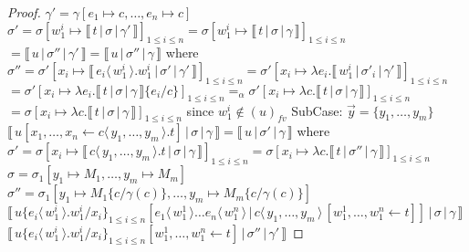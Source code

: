 \documentclass[a4paper,UKenglish,cleveref, autoref]{lipics-v2019}
\newcommand{\fv}[1]{(#1)_{fv}}
\newcommand{\set}[1]{ \{ #1 \} }
\newcommand{\abs}[2]{\lambda #1 . #2}
\newcommand{\fake}[3]{#1 \langle \, #2 \, \rangle . #3}
\newcommand{\share}[3]{#1 [#2 \leftarrow #3]}
\newcommand{\dist}[5]{#1 [ #2 \, \vert \, \fakedist{#4}{#5} \, #3 ]}
\newcommand{\fakedist}[2]{#1 \langle \, #2 \, \rangle}
\newcommand{\sub}[3]{#1 \{ #2 / #3 \}}
\newcommand{\readbackwmap}[3]{\llbracket \, #1 \, \vert \, #2 \, \vert \, #3  \, \rrbracket }
\begin{document}
\begin{proof}
$\gamma' = \gamma [e_{1}  \mapsto c, \dots, e_{n} \mapsto c]$
\newline
$\sigma' = \sigma [w^{i}_{1} \mapsto \readbackwmap{t}{\sigma}{\gamma'}]_{1 \leq i \leq n} = \sigma [w^{i}_{1} \mapsto \readbackwmap{t}{\sigma}{\gamma}]_{1 \leq i \leq n}$
\newline
$= \readbackwmap{u}{\sigma''}{\gamma'} = \readbackwmap{u}{\sigma''}{\gamma}$
\newline
where
\newline
$\sigma'' = \sigma' [x_{i} \mapsto \readbackwmap{\fake{e_{i}}{w^{i}_{1}}{w^{i}_{1}}}{\sigma'}{\gamma'}]_{1 \leq i \leq n} = \sigma' [x_{i} \mapsto \abs{e_{i}}{\readbackwmap{w^{i}_{1}}{\sigma'_{i}}{\gamma'}}]_{1 \leq i \leq n}$
\newline
\indent $= \sigma' [x_{i} \mapsto \abs{e_{i}}{\readbackwmap{t}{\sigma}{\gamma} \sub{}{e_{i}}{c}}]_{1 \leq i \leq n} =_{\alpha} \sigma' [x_{i} \mapsto \abs{c}{\readbackwmap{t}{\sigma}{\gamma}}]_{1 \leq i \leq n}$
\newline
\indent $=  \sigma [x_{i} \mapsto \abs{c}{\readbackwmap{t}{\sigma}{\gamma}}]_{1 \leq i \leq n}$ since $w^{i}_{1} \not\in \fv{u}$
\newline
\newline
SubCase: $\vec{y} = \set{y_{1}, \dots, y_{m}}$
\newline
$\readbackwmap{\share{u}{x_{1}, \dots, x_{n}}{\fake{c}{y_{1}, \dots, y_{m}}{t}}}{\sigma}{\gamma} = \readbackwmap{u}{\sigma'}{\gamma}$
\newline
where
\newline
$\sigma' = \sigma [x_{i} \mapsto \readbackwmap{\fake{c}{y_{1}, \dots, y_{m}}{t}}{\sigma}{\gamma}]_{1 \leq i \leq n} = \sigma [x_{i} \mapsto \abs{c}{\readbackwmap{t}{\sigma''}{\gamma}}]_{1 \leq i \leq n}$
\newline
$\sigma = \sigma_{1} [y_{1} \mapsto M_{1} , \dots , y_{m} \mapsto M_{m} ]$
\newline
$\sigma'' = \sigma_{1}[ y_{1} \mapsto M_{1} \sub{}{c}{\gamma(c)} , \dots , y_{m} \mapsto M_{m} \sub{}{c}{\gamma(c)}]$
\newline
\newline
$\readbackwmap{\sub{u}{\fake{e_{i}}{w^{i}_{1}}{w^{i}_{1}}}{x_{i}}_{1 \leq i \leq n} \dist{}{\fakedist{e_{1}}{w^{1}_{1}} \dots \fakedist{e_{n}}{w^{n}_{1}}}{\share{}{w^{1}_{1}, \dots, w^{n}_{1}}{t}}{c}{y_{1}, \dots, y_{m}}}{\sigma}{\gamma}$
\newline
$\readbackwmap{\sub{u}{\fake{e_{i}}{w^{i}_{1}}{w^{i}_{1}}}{x_{i}}_{1 \leq i \leq n} \share{}{w^{1}_{1}, \dots, w^{n}_{1}}{t}}{\sigma''}{\gamma'}$

\end{proof}
\end{document}
